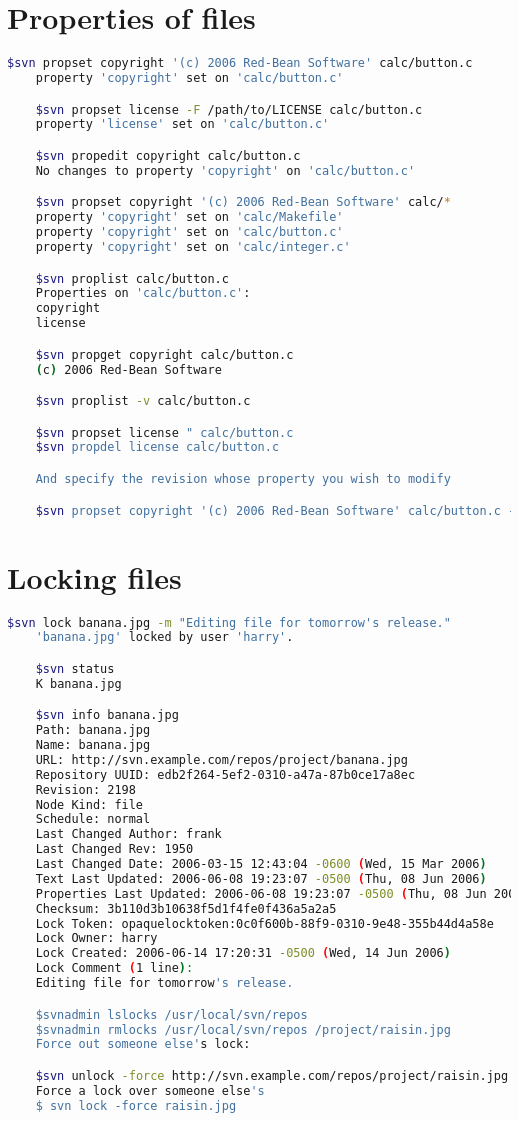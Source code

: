 \documentclass{article}
\begin{document}
\section{Properties of files}
\begin{lstlisting}[language=BASH]
    $svn propset copyright '(c) 2006 Red-Bean Software' calc/button.c
    property 'copyright' set on 'calc/button.c'

    $svn propset license -F /path/to/LICENSE calc/button.c
    property 'license' set on 'calc/button.c'

    $svn propedit copyright calc/button.c
    No changes to property 'copyright' on 'calc/button.c'

    $svn propset copyright '(c) 2006 Red-Bean Software' calc/*
    property 'copyright' set on 'calc/Makefile'
    property 'copyright' set on 'calc/button.c'
    property 'copyright' set on 'calc/integer.c'

    $svn proplist calc/button.c
    Properties on 'calc/button.c':
    copyright
    license

    $svn propget copyright calc/button.c
    (c) 2006 Red-Bean Software

    $svn proplist -v calc/button.c

    $svn propset license " calc/button.c
    $svn propdel license calc/button.c

    And specify the revision whose property you wish to modify

    $svn propset copyright '(c) 2006 Red-Bean Software' calc/button.c -r11 -revprop
\end{lstlisting}

\section{Locking files}
\begin{lstlisting}[language=BASH]
    $svn lock banana.jpg -m "Editing file for tomorrow's release."
    'banana.jpg' locked by user 'harry'.

    $svn status
    K banana.jpg

    $svn info banana.jpg
    Path: banana.jpg
    Name: banana.jpg
    URL: http://svn.example.com/repos/project/banana.jpg
    Repository UUID: edb2f264-5ef2-0310-a47a-87b0ce17a8ec
    Revision: 2198
    Node Kind: file
    Schedule: normal
    Last Changed Author: frank
    Last Changed Rev: 1950
    Last Changed Date: 2006-03-15 12:43:04 -0600 (Wed, 15 Mar 2006)
    Text Last Updated: 2006-06-08 19:23:07 -0500 (Thu, 08 Jun 2006)
    Properties Last Updated: 2006-06-08 19:23:07 -0500 (Thu, 08 Jun 2006)
    Checksum: 3b110d3b10638f5d1f4fe0f436a5a2a5
    Lock Token: opaquelocktoken:0c0f600b-88f9-0310-9e48-355b44d4a58e
    Lock Owner: harry
    Lock Created: 2006-06-14 17:20:31 -0500 (Wed, 14 Jun 2006)
    Lock Comment (1 line):
    Editing file for tomorrow's release.

    $svnadmin lslocks /usr/local/svn/repos
    $svnadmin rmlocks /usr/local/svn/repos /project/raisin.jpg
    Force out someone else's lock:

    $svn unlock -force http://svn.example.com/repos/project/raisin.jpg
    Force a lock over someone else's
    $ svn lock -force raisin.jpg 
\end{lstlisting}
\end{document}
